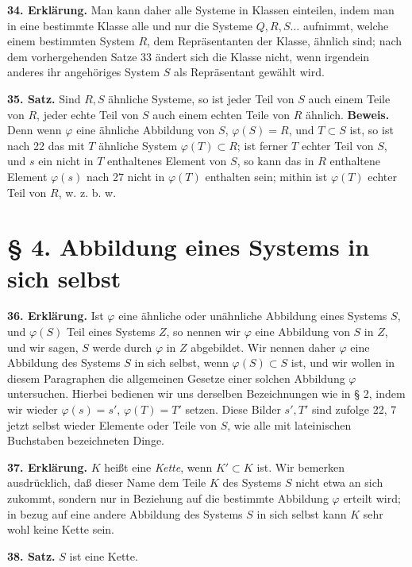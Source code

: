 \documentclass[11pt]{article}
\newcommand{\partof}{\mathrel{\subset}}
\begin{document}
\noindent\textbf{34. Erklärung.} Man kann daher alle Systeme in Klassen einteilen, indem man in eine bestimmte Klasse alle und nur die Systeme $Q,R,S\ldots$ aufnimmt, welche einem bestimmten System $R$, dem Repräsentanten der Klasse, ähnlich sind; nach dem vorhergehenden Satze 33 ändert sich die Klasse nicht, wenn irgendein anderes ihr angehöriges System $S$ als Repräsentant gewählt wird.

\noindent\textbf{35. Satz.} Sind $R,S$ ähnliche Systeme, so ist jeder Teil von $S$ auch einem Teile von $R$, jeder echte Teil von $S$ auch einem echten Teile von $R$ ähnlich. \textbf{Beweis.} Denn wenn $\varphi$ eine ähnliche Abbildung von $S$, $\varphi(S)=R$, und $T\partof S$ ist, so ist nach 22 das mit $T$ ähnliche System $\varphi(T)\partof R$; ist ferner $T$ echter Teil von $S$, und $s$ ein nicht in $T$ enthaltenes Element von $S$, so kann das in $R$ enthaltene Element $\varphi(s)$ nach 27 nicht in $\varphi(T)$ enthalten sein; mithin ist $\varphi(T)$ echter Teil von $R$, w. z. b. w.

\section*{§ 4. Abbildung eines Systems in sich selbst}

\noindent\textbf{36. Erklärung.} Ist $\varphi$ eine ähnliche oder unähnliche Abbildung eines Systems $S$, und $\varphi(S)$ Teil eines Systems $Z$, so nennen wir $\varphi$ eine Abbildung von $S$ in $Z$, und wir sagen, $S$ werde durch $\varphi$ in $Z$ abgebildet. Wir nennen daher $\varphi$ eine Abbildung des Systems $S$ in sich selbst, wenn $\varphi(S)\partof S$ ist, und wir wollen in diesem Paragraphen die allgemeinen Gesetze einer solchen Abbildung $\varphi$ untersuchen. Hierbei bedienen wir uns derselben Bezeichnungen wie in § 2, indem wir wieder $\varphi(s)=s'$, $\varphi(T)=T'$ setzen. Diese Bilder $s',T'$ sind zufolge 22, 7 jetzt selbst wieder Elemente oder Teile von $S$, wie alle mit lateinischen Buchstaben bezeichneten Dinge.

\noindent\textbf{37. Erklärung.} $K$ heißt eine \emph{Kette}, wenn $K'\partof K$ ist. Wir bemerken ausdrücklich, daß dieser Name dem Teile $K$ des Systems $S$ nicht etwa an sich zukommt, sondern nur in Beziehung auf die bestimmte Abbildung $\varphi$ erteilt wird; in bezug auf eine andere Abbildung des Systems $S$ in sich selbst kann $K$ sehr wohl keine Kette sein.

\noindent\textbf{38. Satz.} $S$ ist eine Kette.
\end{document}
